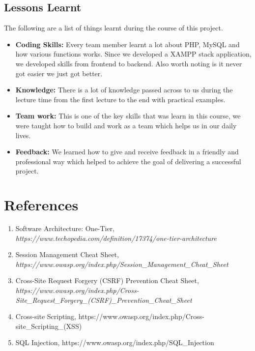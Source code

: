 \documentclass[12pt,a4paper]{article}
\begin{document}
	\subsection{Lessons Learnt}
	\begin{flushleft}
		The following are a list of things learnt during the course of this project.
		\begin{itemize}
		\item \textbf{Coding Skills:} Every team member learnt a lot about PHP, MySQL and how various functions works. Since we developed a XAMPP stack application, we developed skills from frontend to backend. Also worth noting is it never got easier we just got better.
		\item \textbf{Knowledge:} There is a lot of knowledge passed across to us during the lecture time from the first lecture to the end with practical examples.
		\item \textbf{Team work:} This is one of the key skills that was learn in this course, we were taught how to build and work as a
		team which helps us in our daily lives.
		\item \textbf{Feedback:} We learned how to give and receive feedback in a friendly and professional way which helped to achieve the goal of delivering a successful project.
		\end{itemize}
	\end{flushleft}
	
	\section{References}
	
	\begin{enumerate}
		\item Software Architecture: One-Tier, \textit{https://www.techopedia.com/definition/17374/one-tier-architecture}
		\item Session Management Cheat Sheet, \textit{https://www.owasp.org/index.php/Session\_Management\_Cheat\_Sheet}
		\item Cross-Site Request Forgery (CSRF) Prevention Cheat Sheet, \textit{https://www.owasp.org/index.php/Cross-Site\_Request\_Forgery\_(CSRF)\_Prevention\_Cheat\_Sheet}
		\item Cross-site Scripting, https://www.owasp.org/index.php/Cross-site\_Scripting\_(XSS)
		\item SQL Injection, https://www.owasp.org/index.php/SQL\_Injection
	\end{enumerate}
	
		
	
\end{document}
